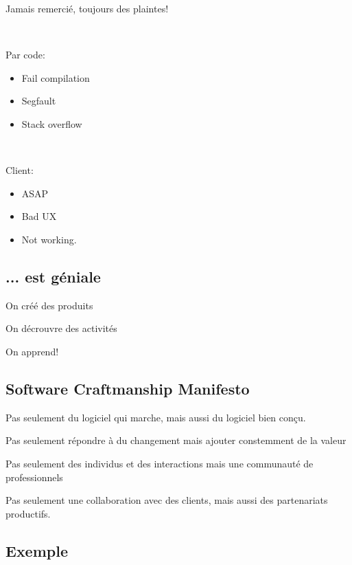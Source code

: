 \documentclass[a4paper,11pt]{article}
\begin{document}
Jamais remercié, toujours des plaintes!

\

Par code:

\begin{itemize}

\item Fail compilation

\item Segfault

\item Stack overflow

\end{itemize}

\

Client:

\begin{itemize}

\item ASAP

\item Bad UX

\item Not working.

\end{itemize}

\subsection{... est géniale}

On créé des produits

On décrouvre des activités

On apprend!

\subsection{Software Craftmanship Manifesto}

Pas seulement du logiciel qui marche, mais aussi du logiciel bien conçu.

Pas seulement répondre à du changement mais ajouter constemment de la valeur

Pas seulement des individus et des interactions mais une communauté de
professionnels

Pas seulement une collaboration avec des clients, mais aussi des partenariats
productifs.

\subsection{Exemple}
\end{document}
